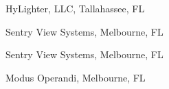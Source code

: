 \documentclass[12pt,letterpaper]{report}
\begin{document}
    \begin{tablist}
        \item[2020--  ] \tab{}HyLighter, LLC, Tallahassee, FL
        \item[2024-- ] \tab{}Sentry View Systems, Melbourne, FL
        \item[2021--21] \tab{}Sentry View Systems, Melbourne, FL
        \item[2016--17] \tab{}Modus Operandi, Melbourne, FL
    \end{tablist}


\end{document}
